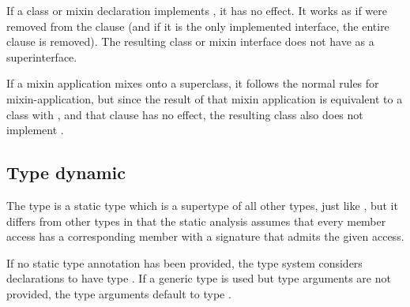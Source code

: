 \documentclass[makeidx]{article}
\begin{document}
\LMHash{}%
If a class or mixin declaration implements \FUNCTION, it has no effect.
It works as if \FUNCTION{} were removed from the  clause
(and if it is the only implemented interface, the entire clause is removed).
The resulting class or mixin interface
does not have \FUNCTION{} as a superinterface.

\LMHash{}%
If a mixin application mixes \FUNCTION{} onto a superclass, it follows the
normal rules for mixin-application, but since the result of that mixin
application is equivalent to a class with , and
that clause has no effect, the resulting class also does not
implement \FUNCTION.



\subsection{Type dynamic}

\LMHash{}%
The type \DYNAMIC{} is a static type which is a supertype of all other types,
just like ,
but it differs from other types in that the static analysis
assumes that every member access has a corresponding member
with a signature that admits the given access.


\LMHash{}%
If no static type annotation has been provided,
the type system considers declarations to have type \DYNAMIC.
If a generic type is used but type arguments are not provided,
the type arguments default to type \DYNAMIC.
\end{document}
